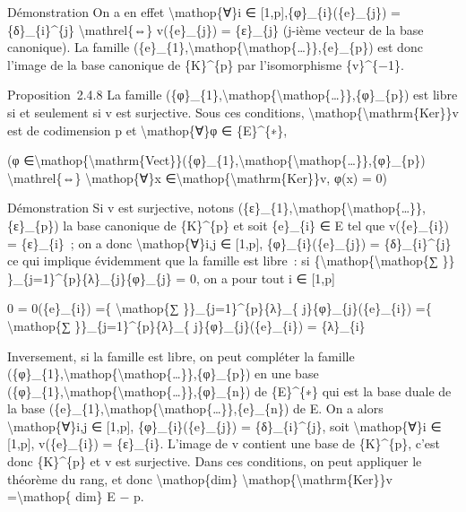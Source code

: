 \documentclass[]{article}
\begin{document}
Démonstration On a en effet \textbackslash{}mathop\{∀\}i ∈
{[}1,p{]},\{φ\}\_\{i\}(\{e\}\_\{j\}) = \{δ\}\_\{i\}\^{}\{j\}
\textbackslash{}mathrel\{⇔\} v(\{e\}\_\{j\}) = \{ε\}\_\{j\} (j-ième
vecteur de la base canonique). La famille
(\{e\}\_\{1\},\textbackslash{}mathop\{\textbackslash{}mathop\{\ldots{}\}\},\{e\}\_\{p\})
est donc l'image de la base canonique de \{K\}\^{}\{p\} par
l'isomorphisme \{v\}\^{}\{−1\}.

Proposition~2.4.8 La famille
(\{φ\}\_\{1\},\textbackslash{}mathop\{\textbackslash{}mathop\{\ldots{}\}\},\{φ\}\_\{p\})
est libre si et seulement si v est surjective. Sous ces conditions,
\textbackslash{}mathop\{\textbackslash{}mathrm\{Ker\}\}v est de
codimension p et \textbackslash{}mathop\{∀\}φ ∈ \{E\}\^{}\{∗\},

(φ
∈\textbackslash{}mathop\{\textbackslash{}mathrm\{Vect\}\}(\{φ\}\_\{1\},\textbackslash{}mathop\{\textbackslash{}mathop\{\ldots{}\}\},\{φ\}\_\{p\})
\textbackslash{}mathrel\{⇔\} \textbackslash{}mathop\{∀\}x
∈\textbackslash{}mathop\{\textbackslash{}mathrm\{Ker\}\}v, φ(x) = 0)

Démonstration Si v est surjective, notons
(\{ε\}\_\{1\},\textbackslash{}mathop\{\textbackslash{}mathop\{\ldots{}\}\},\{ε\}\_\{p\})
la base canonique de \{K\}\^{}\{p\} et soit \{e\}\_\{i\} ∈ E tel que
v(\{e\}\_\{i\}) = \{ε\}\_\{i\}~; on a donc
\textbackslash{}mathop\{∀\}i,j ∈ {[}1,p{]}, \{φ\}\_\{i\}(\{e\}\_\{j\}) =
\{δ\}\_\{i\}\^{}\{j\} ce qui implique évidemment que la famille est
libre~: si \{\textbackslash{}mathop\{\textbackslash{}mathop\{∑ \}\}
\}\_\{j=1\}\^{}\{p\}\{λ\}\_\{j\}\{φ\}\_\{j\} = 0, on a pour tout i ∈
{[}1,p{]}

0 = 0(\{e\}\_\{i\}) =\{ \textbackslash{}mathop\{∑
\}\}\_\{j=1\}\^{}\{p\}\{λ\}\_\{ j\}\{φ\}\_\{j\}(\{e\}\_\{i\}) =\{
\textbackslash{}mathop\{∑ \}\}\_\{j=1\}\^{}\{p\}\{λ\}\_\{
j\}\{φ\}\_\{j\}(\{e\}\_\{i\}) = \{λ\}\_\{i\}

Inversement, si la famille est libre, on peut compléter la famille
(\{φ\}\_\{1\},\textbackslash{}mathop\{\textbackslash{}mathop\{\ldots{}\}\},\{φ\}\_\{p\})
en une base
(\{φ\}\_\{1\},\textbackslash{}mathop\{\textbackslash{}mathop\{\ldots{}\}\},\{φ\}\_\{n\})
de \{E\}\^{}\{∗\} qui est la base duale de la base
(\{e\}\_\{1\},\textbackslash{}mathop\{\textbackslash{}mathop\{\ldots{}\}\},\{e\}\_\{n\})
de E. On a alors \textbackslash{}mathop\{∀\}i,j ∈ {[}1,p{]},
\{φ\}\_\{i\}(\{e\}\_\{j\}) = \{δ\}\_\{i\}\^{}\{j\}, soit
\textbackslash{}mathop\{∀\}i ∈ {[}1,p{]}, v(\{e\}\_\{i\}) =
\{ε\}\_\{i\}. L'image de v contient une base de \{K\}\^{}\{p\}, c'est
donc \{K\}\^{}\{p\} et v est surjective. Dans ces conditions, on peut
appliquer le théorème du rang, et donc \textbackslash{}mathop\{dim\}
\textbackslash{}mathop\{\textbackslash{}mathrm\{Ker\}\}v
=\textbackslash{}mathop\{ dim\} E − p.
\end{document}
